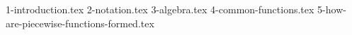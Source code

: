 \documentclass[10pt,a4paper]{article}
\begin{document}
\maketitle
\tableofcontents
\newpage

{1-introduction.tex}
{2-notation.tex}
{3-algebra.tex}
{4-common-functions.tex}
{5-how-are-piecewise-functions-formed.tex}
\end{document}
